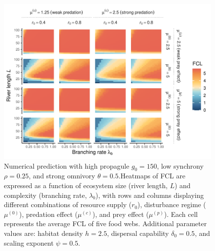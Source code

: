 \begin{figure}
\centering
\includegraphics{../data_fmt/fig_rho025_g150_theta05.pdf}
\caption{\label{fig:fig-num6}Numerical prediction with high propagule
\(g_0 = 150\), low synchrony \(\rho = 0.25\), and strong omnivory
\(\theta = 0.5\).Heatmaps of FCL are expressed as a function of
ecosystem size (river length, \(L\)) and complexity (branching rate,
\(\lambda_b\)), with rows and columns displaying different combinations
of resource supply (\(r_0\)), disturbance regime (\(\mu^{(0)}\)),
predation effect (\(\mu^{(c)}\)), and prey effect (\(\mu^{(p)}\)). Each
cell represents the average FCL of five food webs. Additional parameter
values are: habitat density \(h=2.5\), dispersal capability
\(\delta_0=0.5\), and scaling exponent \(\psi=0.5\).}
\end{figure}

\newpage

